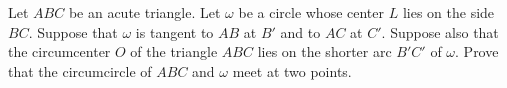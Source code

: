 Let $ABC$ be an acute triangle. Let $\omega$ be a circle whose center $L$ lies on the side $BC$. Suppose that $\omega$ is tangent to $AB$ at $B'$ and to $AC$ at $C'$. Suppose also that the circumcenter $O$ of the triangle $ABC$ lies on the shorter arc $B'C'$ of $\omega$. Prove that the circumcircle of $ABC$ and $\omega$ meet at two points.
